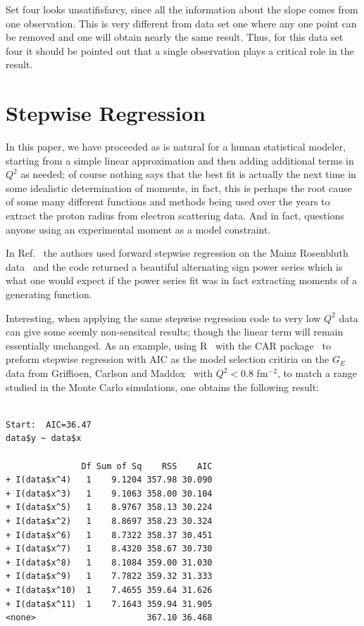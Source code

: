 \documentclass[10pt,aps,prc,twocolumn]{revtex4-1}
\begin{document}
\begin{appendix}
Set four looks unsatifisfarcy, since all the information about the slope comes
from one observation.   This is very different from data set one where any one point
can be removed and one will obtain nearly the same result.   Thus, for this data set
four it should be pointed out that a single observation plays a critical role
in the result.

\section{Stepwise Regression}

In this paper, we have proceeded as is natural for a human statistical modeler, starting from a simple
linear approximation and then adding additional terms in $Q^2$ as needed; of course nothing
says that the best fit is actually the next time in some idealistic determination of moments,
in fact, this is perhaps the root cause of some many different functions and methods being used
over the years to extract the proton radius from electron scattering data.   And in fact, questions
anyone using an experimental moment as a model constraint.

In Ref.~\cite{Higinbotham:2015rja} the authors used forward stepwise regression on the Mainz
Rosenbluth data~\cite{Bernauer:2010wm} and the code returned a beautiful alternating sign power 
series which is what one would expect if the power series fit was in fact extracting moments
of a generating function.   

Interesting, when applying the same stepwise regression code to very low $Q^2$ data can give
some seemly non-sensitcal results; though the linear term will remain essentially unchanged.   
As an example, using R~\cite{R} with the CAR package~\cite{car} to preform stepwise regression with AIC as the
model selection critiria on the $G_E$ data from Griffioen, 
Carlson and Maddox~\cite{Griffioen:2015hta} with $Q^2 < 0.8$ fm$^{-2}$, to match a range studied
in the Monte Carlo simulations, one obtains the following result:

\begin{Verbatim}[fontsize=\footnotesize]

Start:  AIC=36.47
data$y ~ data$x

               Df Sum of Sq    RSS    AIC
+ I(data$x^4)   1    9.1204 357.98 30.090
+ I(data$x^3)   1    9.1063 358.00 30.104
+ I(data$x^5)   1    8.9767 358.13 30.224
+ I(data$x^2)   1    8.8697 358.23 30.324
+ I(data$x^6)   1    8.7322 358.37 30.451
+ I(data$x^7)   1    8.4320 358.67 30.730
+ I(data$x^8)   1    8.1084 359.00 31.030
+ I(data$x^9)   1    7.7822 359.32 31.333
+ I(data$x^10)  1    7.4655 359.64 31.626
+ I(data$x^11)  1    7.1643 359.94 31.905
<none>                      367.10 36.468


\end{Verbatim}
\end{appendix}
\end{document}
